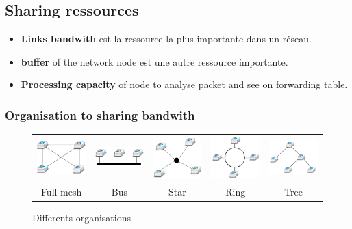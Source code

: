\subsection{Sharing ressources}
\begin{itemize}
    \item \textbf{Links bandwith} est la ressource la plus importante dans un réseau.
    \item \textbf{buffer} of the network node  est une autre ressource importante.
    \item \textbf{Processing capacity} of node to analyse packet and see on forwarding table.
\end{itemize}

\subsubsection{Organisation to sharing bandwith}
\begin{figure}[h]
    \centering
    \begin{tabular}{ccccc}
    \includegraphics[width=2cm]{fullmesh.png} &
    \includegraphics[width=2cm]{bus.png} &
    \includegraphics[width=2cm]{star.png} &
    \includegraphics[width=2cm]{circle.png} &
    \includegraphics[width=2cm]{tree.png} \\
    Full mesh & Bus & Star & Ring & Tree
\end{tabular}
    \caption{Differents organisations}
\end{figure}

